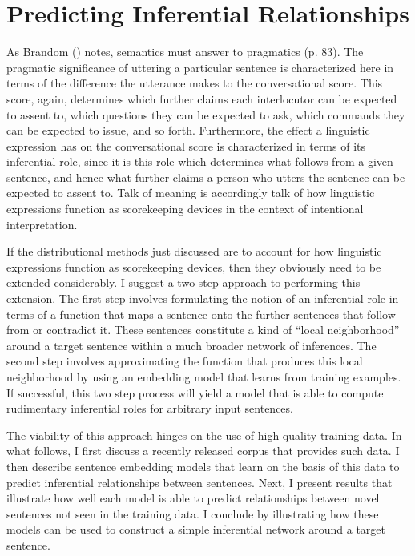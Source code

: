 \section{Predicting Inferential Relationships}

As Brandom (\citeyear{Brandom:1994}) notes, semantics must answer to pragmatics (p. 83). The pragmatic significance of uttering a particular sentence is characterized here in terms of the difference the utterance makes to the conversational score. This score, again, determines which further claims each interlocutor can be expected to assent to, which questions they can be expected to ask, which commands they can be expected to issue, and so forth. Furthermore, the effect a linguistic expression has on the conversational score is characterized in terms of its inferential role, since it is this role which determines what follows from a given sentence, and hence what further claims a person who utters the sentence can be expected to assent to. Talk of meaning is accordingly talk of how linguistic expressions function as scorekeeping devices in the context of intentional interpretation.  

If the distributional methods just discussed are to account for how linguistic expressions function as scorekeeping devices, then they obviously need to be extended considerably. I suggest a two step approach to performing this extension. The first step involves formulating the notion of an inferential role in terms of a function that maps a sentence onto the further sentences that follow from or contradict it. These sentences constitute a kind of ``local neighborhood'' around a target sentence within a much broader network of inferences. The second step involves approximating the function that produces this local neighborhood by using an embedding model that learns from training examples. If successful, this two step process will yield a model that is able to compute rudimentary inferential roles for arbitrary input sentences. 

The viability of this approach hinges on the use of high quality training data. In what follows, I first discuss a recently released corpus that provides such data. I then describe sentence embedding models that learn on the basis of this data to predict inferential relationships between sentences. Next, I present results that illustrate how well each model is able to predict relationships between novel sentences not seen in the training data. I conclude by illustrating how these models can be used to construct a simple inferential network around a target sentence.  

